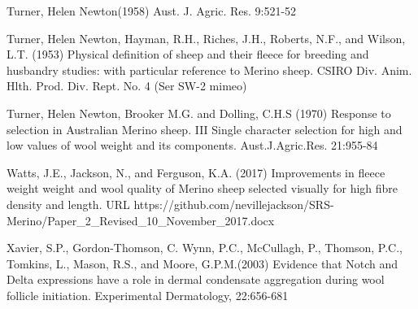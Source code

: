 \documentclass[titlepage]{article}  %
\begin{document}
\begin{thebibliography}{99}
Turner, Helen Newton(1958) Aust. J. Agric. Res. 9:521-52

Turner, Helen Newton, Hayman, R.H., Riches, J.H., Roberts, N.F., and Wilson, L.T. (1953) Physical definition of sheep and their fleece for breeding and husbandry studies: with particular reference to Merino sheep. CSIRO Div. Anim. Hlth. Prod. Div. Rept. No. 4 (Ser SW-2 mimeo)

Turner, Helen Newton, Brooker M.G. and Dolling, C.H.S (1970) Response to selection in Australian Merino sheep. III Single character selection for high and low values of wool weight and its components. Aust.J.Agric.Res. 21:955-84

Watts, J.E., Jackson, N., and Ferguson, K.A. (2017) Improvements in fleece weight weight and wool quality of Merino sheep selected visually for high fibre density and length. URL https://github.com/nevillejackson/SRS-Merino/Paper\_2\_Revised\_10\_November\_2017.docx 

Xavier, S.P., Gordon-Thomson, C. Wynn, P.C., McCullagh, P., Thomson, P.C., Tomkins, L., Mason, R.S., and Moore, G.P.M.(2003) Evidence that Notch and Delta expressions have a role in dermal condensate aggregation during wool follicle initiation. Experimental Dermatology, 22:656-681

\end{thebibliography}
\end{document}
